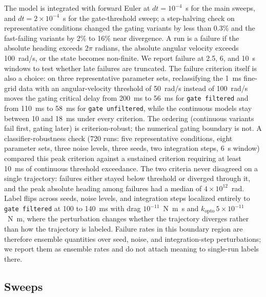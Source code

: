 \documentclass[pdflatex,sn-nature]{sn-jnl}
\begin{document}
The model is integrated with forward Euler at $dt = 10^{-4}$~s for the main sweeps, and $dt = 2\times10^{-4}$~s for the gate-threshold sweep; a step-halving check on representative conditions changed the gating variants by less than 0.3\% and the fast-failing variants by 2\% to 16\% near divergence. A run is a failure if the absolute heading exceeds $2\pi$ radians, the absolute angular velocity exceeds 100~rad/s, or the state becomes non-finite. We report failure at 2.5, 6, and 10~s windows to test whether late failures are truncated. The failure criterion itself is also a choice: on three representative parameter sets, reclassifying the 1~ms fine-grid data with an angular-velocity threshold of 50~rad/s instead of 100~rad/s moves the gating critical delay from 200~ms to 56~ms for \texttt{gate filtered} and from 110~ms to 58~ms for \texttt{gate unfiltered}, while the continuous models stay between 10 and 18~ms under every criterion. The ordering (continuous variants fail first, gating later) is criterion-robust; the numerical gating boundary is not. A classifier-robustness check (720 runs: five representative conditions, eight parameter sets, three noise levels, three seeds, two integration steps, 6~s window) compared this peak criterion against a sustained criterion requiring at least 10~ms of continuous threshold exceedance. The two criteria never disagreed on a single trajectory: failures either stayed below threshold or diverged through it, and the peak absolute heading among failures had a median of $4\times10^{12}$~rad. Label flips across seeds, noise levels, and integration steps localized entirely to \texttt{gate filtered} at 100 to 140~ms with drag $10^{-11}$~N~m~s and $k_{\mathrm{opto}}\,5\times10^{-11}$~N~m, where the perturbation changes whether the trajectory diverges rather than how the trajectory is labeled. Failure rates in this boundary region are therefore ensemble quantities over seed, noise, and integration-step perturbations; we report them as ensemble rates and do not attach meaning to single-run labels there.

\subsection{Sweeps}
\end{document}
